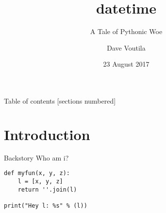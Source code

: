 \documentclass[10pt]{beamer}
\title{datetime}
\subtitle{A Tale of Pythonic Woe}
\date{23 August 2017}
\author{Dave Voutila}
\institute{Sisu Integrated Services, LLC}
\begin{document}
\maketitle

\begin{frame}{Table of contents}
  [sections numbered]
  \tableofcontents[hideallsubsections]
\end{frame}

\section{Introduction}
\begin{frame}[fragile]{Backstory}
Who am i?

\begin{verbatim}
def myfun(x, y, z):
	l = [x, y, z]
	return ''.join(l)

print("Hey l: %s" % (l))
\end{verbatim}

\end{frame}
\end{document}
